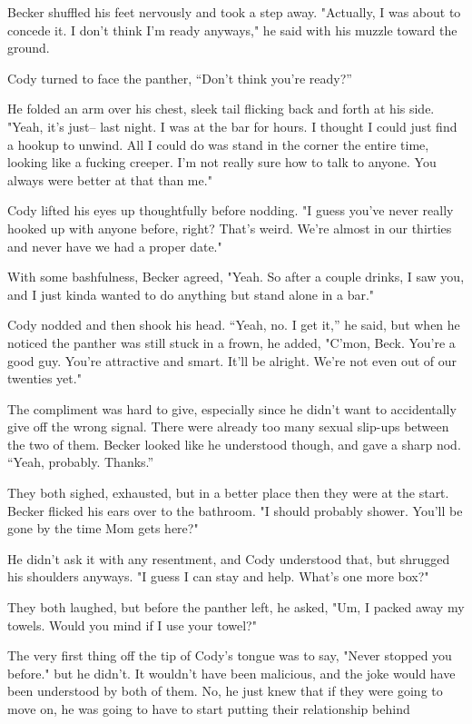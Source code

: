 Becker shuffled his feet nervously and took a step away. "Actually, I
was about to concede it. I don't think I'm ready anyways," he said with
his muzzle toward the ground.

Cody turned to face the panther, ``Don't think you're ready?''

He folded an arm over his chest, sleek tail flicking back and forth at
his side. "Yeah, it's just-- last night. I was at the bar for hours. I
thought I could just find a hookup to unwind. All I could do was stand
in the corner the entire time, looking like a fucking creeper. I'm not
really sure how to talk to anyone. You always were better at that than
me."

Cody lifted his eyes up thoughtfully before nodding. "I guess you've
never really hooked up with anyone before, right? That's weird. We're
almost in our thirties and never have we had a proper date."

With some bashfulness, Becker agreed, "Yeah. So after a couple drinks, I
saw you, and I just kinda wanted to do anything but stand alone in a
bar."

Cody nodded and then shook his head. ``Yeah, no. I get it,'' he said, but
when he noticed the panther was still stuck in a frown, he added,
"C'mon, Beck. You're a good guy. You're attractive and smart. It'll be
alright. We're not even out of our twenties yet."

The compliment was hard to give, especially since he didn't want to
accidentally give off the wrong signal. There were already too many
sexual slip-ups between the two of them. Becker looked like he
understood though, and gave a sharp nod. ``Yeah, probably. Thanks.''

They both sighed, exhausted, but in a better place then they were at the
start. Becker flicked his ears over to the bathroom. "I should probably
shower. You'll be gone by the time Mom gets here?"

He didn't ask it with any resentment, and Cody understood that, but
shrugged his shoulders anyways. "I guess I can stay and help. What's one
more box?"

They both laughed, but before the panther left, he asked, "Um, I packed
away my towels. Would you mind if I use your towel?"

The very first thing off the tip of Cody's tongue was to say, "Never
stopped you before." but he didn't. It wouldn't have been malicious, and
the joke would have been understood by both of them. No, he just knew
that if they were going to move on, he was going to have to start
putting their relationship behind

